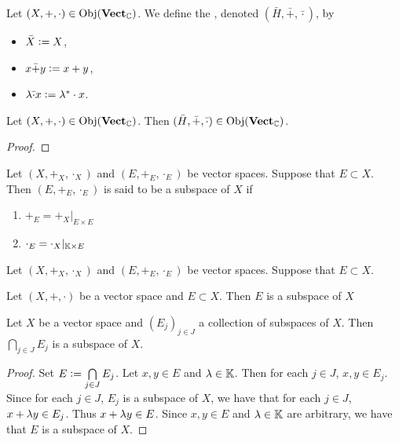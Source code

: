 \documentclass{book}
\begin{document}
	\begin{defn}
		Let $(X, +, \cdot) \in \operatorname{Obj}(\operatorname*{\text{\textbf{Vect}}_{\mathbb{C}}})$. We define the , denoted $(\bar{H}, \bar{+}, \bar{\cdot})$, by 
		\begin{itemize}
			\item $\bar{X} \vcentcolon= X$,
			\item $x \bar{+} y \vcentcolon= x + y$,
			\item $\lambda \bar{\cdot} x \vcentcolon= \lambda^* \cdot x$.
		\end{itemize}
	\end{defn}
	
	\begin{ex}
		Let $(X, +, \cdot) \in \operatorname{Obj}(\operatorname*{\text{\textbf{Vect}}_{\mathbb{C}}})$. Then $(\bar{H}, \bar{+}, \bar{\cdot}) \in \operatorname{Obj}(\operatorname*{\text{\textbf{Vect}}_{\mathbb{C}}})$.
	\end{ex}
	
	\begin{proof}
		\tcr{FINISH!!!}
	\end{proof}
	
	
	\begin{defn}
		Let $(X, +_X, \cdot_X)$ and $(E, +_E, \cdot_E)$ be vector spaces. Suppose that $E \subset X$. Then $(E, +_E, \cdot_E)$ is said to be a subspace of $X$ if 
		\begin{enumerate}
			\item $+_E = +_X|_{E \times E}$
			\item $\cdot_E = \cdot_X|_{\mathbb{K} \times E}$
		\end{enumerate}
	\end{defn}
	
	\begin{ex}
		Let $(X, +_X, \cdot_X)$ and $(E, +_E, \cdot_E)$ be vector spaces. Suppose that $E \subset X$. 
	\end{ex}
	
	\begin{ex}
		Let $(X, +, \cdot)$ be a vector space and $E \subset X$. Then $E$ is a subspace of $X$
	\end{ex}
	
	
	\begin{defn}
		Let $X$ be a vector space and $(E_j)_{j \in J}$ a collection of subspaces of $X$. Then $\bigcap\limits_{j \in J}E_j$ is a subspace of $X$. 
	\end{defn}
	
	\begin{proof}
		Set $E \vcentcolon= \bigcap\limits_{j \in J}E_j$. Let $x,y \in E$ and $\lambda \in \mathbb{K}$. Then for each $j \in J$, $x,y \in E_j$. Since for each $j \in J$, $E_j$ is a subspace of $X$, we have that for each $j \in J$, $x+ \lambda y \in E_j$. Thus $x+\lambda y \in E$. Since $x,y \in E$ and $\lambda \in \mathbb{K}$ are arbitrary,  we have that $E$ is a subspace of $X$. 
	\end{proof}
	
\end{document}
